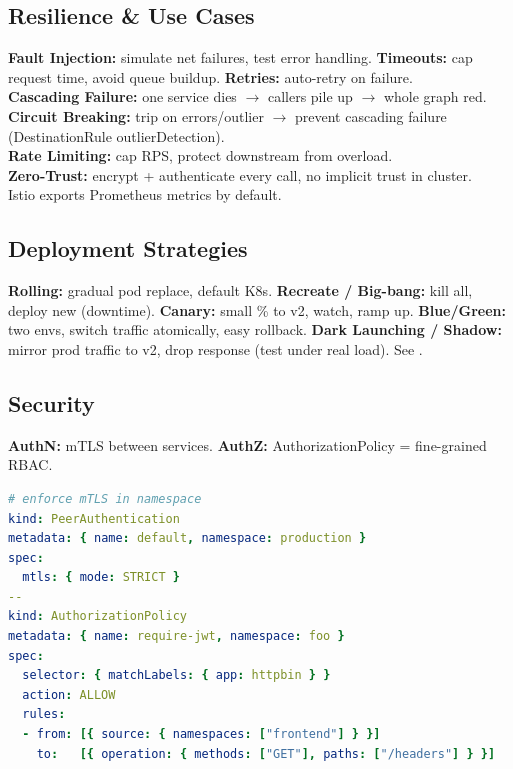 \subsection{Resilience \& Use Cases}
\textbf{Fault Injection:} simulate net failures, test error handling. \textbf{Timeouts:} cap request time, avoid queue buildup. \textbf{Retries:} auto-retry on failure. \\
\textbf{Cascading Failure:} one service dies $\to$ callers pile up $\to$ whole graph red. \\
\textbf{Circuit Breaking:} trip on errors/outlier $\to$ prevent cascading failure (DestinationRule outlierDetection). \\
\textbf{Rate Limiting:} cap RPS, protect downstream from overload. \\
\textbf{Zero-Trust:} encrypt + authenticate every call, no implicit trust in cluster. \\
Istio exports Prometheus metrics by default.

\subsection{Deployment Strategies}
\textbf{Rolling:} gradual pod replace, default K8s. \textbf{Recreate / Big-bang:} kill all, deploy new (downtime). \textbf{Canary:} small \% to v2, watch, ramp up. \textbf{Blue/Green:} two envs, switch traffic atomically, easy rollback. \textbf{Dark Launching / Shadow:} mirror prod traffic to v2, drop response (test under real load). See .

\subsection{Security}
\textbf{AuthN:} mTLS between services. \textbf{AuthZ:} AuthorizationPolicy = fine-grained RBAC.
\begin{lstlisting}[language=yaml]
# enforce mTLS in namespace
kind: PeerAuthentication
metadata: { name: default, namespace: production }
spec:
  mtls: { mode: STRICT }
--
kind: AuthorizationPolicy
metadata: { name: require-jwt, namespace: foo }
spec:
  selector: { matchLabels: { app: httpbin } }
  action: ALLOW
  rules:
  - from: [{ source: { namespaces: ["frontend"] } }]
    to:   [{ operation: { methods: ["GET"], paths: ["/headers"] } }]
\end{lstlisting}
